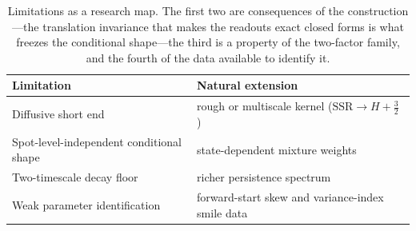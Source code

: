 \documentclass[11pt]{article}
\newcommand{\SSR}{\mathrm{SSR}}
\providecommand{\1}{\mathbf 1}
\begin{document}
\begin{table}[htbp]
\centering
{\small
\begin{tabular}{>{\raggedright\arraybackslash}p{} >{\raggedright\arraybackslash}p{}}
\toprule
Limitation & Natural extension \\
\midrule
Diffusive short end & rough or multiscale kernel ($\SSR\to H{+}\tfrac32$)~\cite{fukasawa2026} \\[2pt]
Spot-level-independent conditional shape & state-dependent mixture weights \\[2pt]
Two-timescale decay floor & richer persistence spectrum \\[2pt]
Weak parameter identification & forward-start skew and variance-index smile data \\
\bottomrule
\end{tabular}}
\caption{Limitations as a research map. The first two are consequences of the construction---the
translation invariance that makes the readouts exact closed forms is what freezes the conditional
shape---the third is a property of the two-factor family, and the fourth of the data available to
identify it.}
\label{tab:limits}
\end{table}
\end{document}
